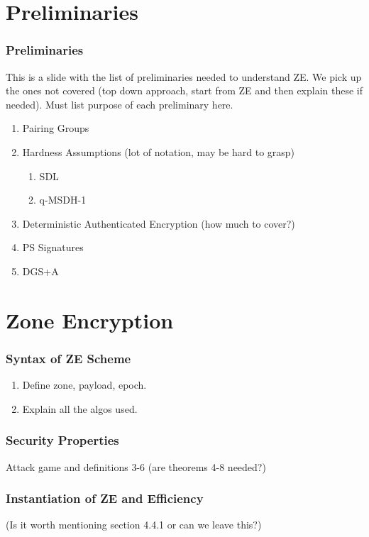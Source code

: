 \documentclass{beamer}
\begin{document}
    \section{Preliminaries}
    \begin{frame}
        \frametitle{Preliminaries}
        This is a slide with the list of preliminaries needed to understand ZE.
        We pick up the ones not covered (top down approach, start from ZE and 
        then explain these if needed). Must list purpose of each preliminary 
        here.
        \begin{enumerate}
            \item Pairing Groups
            \item Hardness Assumptions (lot of notation, may be hard to grasp)
            \begin{enumerate}
                \item SDL
                \item q-MSDH-1
            \end{enumerate}
            \item Deterministic Authenticated Encryption (how much to cover?)
            \item PS Signatures
            \item DGS+A
        \end{enumerate}
    \end{frame}

    \section{Zone Encryption}
    
    \begin{frame}
        \frametitle{Syntax of ZE Scheme}
        \begin{enumerate}
            \item Define zone, payload, epoch.
            \item Explain all the algos used.
        \end{enumerate}
    \end{frame}

    \begin{frame}
        \frametitle{Security Properties}
        Attack game and definitions 3-6 (are theorems 4-8 needed?)
    \end{frame}

    \begin{frame}
        \frametitle{Instantiation of ZE and Efficiency}    
        (Is it worth mentioning section 4.4.1 or can we leave this?)
    \end{frame}
\end{document}
